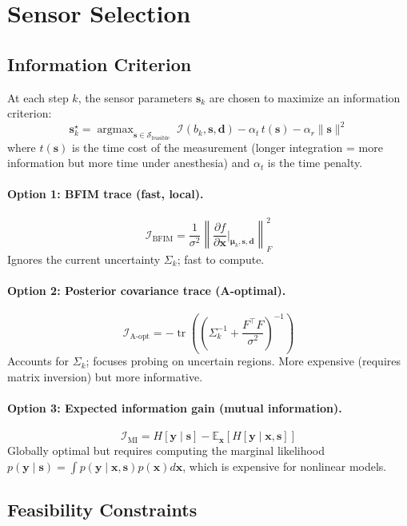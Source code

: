 \documentclass[11pt,a4paper]{article}
\newcommand{\tr}{\operatorname{tr}}
\newcommand{\argmax}{\operatorname{argmax}}
\theoremstyle{definition}
\begin{document}
\section{Sensor Selection}

\subsection{Information Criterion}

At each step $k$, the sensor parameters $\bm{s}_k$ are chosen to maximize an information criterion:
\[
  \bm{s}_k^\star = \argmax_{\bm{s} \in \mathcal{S}_{\text{feasible}}} \; \mathcal{I}(b_k, \bm{s}, \bm{d}) - \alpha_t \, t(\bm{s}) - \alpha_r \|\bm{s}\|^2
\]
where $t(\bm{s})$ is the time cost of the measurement (longer integration = more information but more time under anesthesia) and $\alpha_t$ is the time penalty.

\paragraph{Option 1: BFIM trace (fast, local).}
\[
  \mathcal{I}_{\text{BFIM}} = \frac{1}{\sigma^2} \left\| \frac{\partial f}{\partial \bm{x}}\bigg|_{\bm{\mu}_k, \bm{s}, \bm{d}} \right\|_F^2
\]
Ignores the current uncertainty $\Sigma_k$; fast to compute.

\paragraph{Option 2: Posterior covariance trace (A-optimal).}
\[
  \mathcal{I}_{\text{A-opt}} = -\tr\left(\left(\Sigma_k^{-1} + \frac{F^\top F}{\sigma^2}\right)^{-1}\right)
\]
Accounts for $\Sigma_k$; focuses probing on uncertain regions.  More expensive (requires matrix inversion) but more informative.

\paragraph{Option 3: Expected information gain (mutual information).}
\[
  \mathcal{I}_{\text{MI}} = H[\bm{y} \mid \bm{s}] - \mathbb{E}_{\bm{x}}[H[\bm{y} \mid \bm{x}, \bm{s}]]
\]
Globally optimal but requires computing the marginal likelihood $p(\bm{y} \mid \bm{s}) = \int p(\bm{y} \mid \bm{x}, \bm{s}) p(\bm{x}) d\bm{x}$, which is expensive for nonlinear models.

\subsection{Feasibility Constraints}
\end{document}
